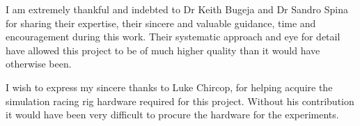 \documentclass{report}
\begin{document}
I am extremely thankful and indebted to Dr Keith Bugeja and Dr Sandro Spina for sharing their expertise, their sincere and valuable guidance, time and encouragement during this work. Their systematic approach and eye for detail have allowed this project to be of much higher quality than it would have otherwise been. 

I wish to express my sincere thanks to Luke Chircop, for helping acquire the simulation racing rig hardware required for this project. Without his contribution it would have been very difficult to procure the hardware for the experiments.

\newpage
\tableofcontents

\newpage
\listoffigures
\listoftables

\newpage
{} 
\setcounter{page}{1}


\newpage


\newpage


\newpage


\newpage


\newpage


\newpage


\newpage
{}


\newpage
\setcounter{page}{1}
\begin{appendices}
	
\end{appendices}
\end{document}
